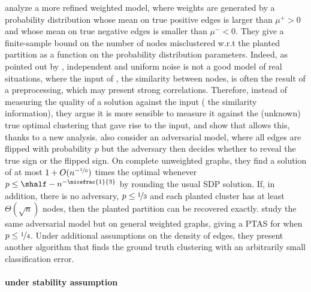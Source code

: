\Textcite{Joachims2005} analyze a more refined weighted model, where weights are generated by a
probability distribution whose mean on true positive edges is larger than $\mu^+>0$ and whose mean
on true negative edges is smaller than $\mu^-<0$. They give a finite-sample bound on the number of
nodes misclustered w.r.t the planted partition as a function on the probability distribution
parameters. Indeed, as pointed out by \textcite{plantedAilon09}, independent and uniform noise is
not a good model of real situations, where the input of \pcc{}, \ie{} the similarity between nodes,
is often the result of a preprocessing, which may present strong correlations. Therefore, instead of
measuring the quality of a solution against the input (\ie{} the similarity information), they
argue it is more sensible to measure it against the (unknown) true optimal clustering that gave rise
to the input, and show that \ccpivot{} allows this, thanks to a new analysis. \Textcite{Mathieu2010}
also consider an adversarial model, where all edges are flipped with probability $p$ but the
adversary then decides whether to reveal the true sign or the flipped sign. On complete unweighted
graphs, they find a solution of \mind{} at most $1 + O(n^{-\nicefrac{1}{6}})$ times the optimal
whenever $p \leq \shalf - n^{-\nicefrac{1}{3}}$ by rounding the usual SDP solution. If, in addition,
there is no adversary, $p\leq\nicefrac{1}{3}$ and each planted cluster has at least
$\Theta(\sqrt{n})$ nodes, then the planted partition can be recovered exactly.
\Textcite{Makarychev2014} study the same adversarial model but on general weighted graphs, giving a PTAS
for \mind{} when $p\leq \nicefrac{1}{4}$. Under additional assumptions on the density of edges, they
present another algorithm that finds the ground truth clustering with an arbitrarily small
classification error.

\paragraph{\pcc{} under stability assumption}

